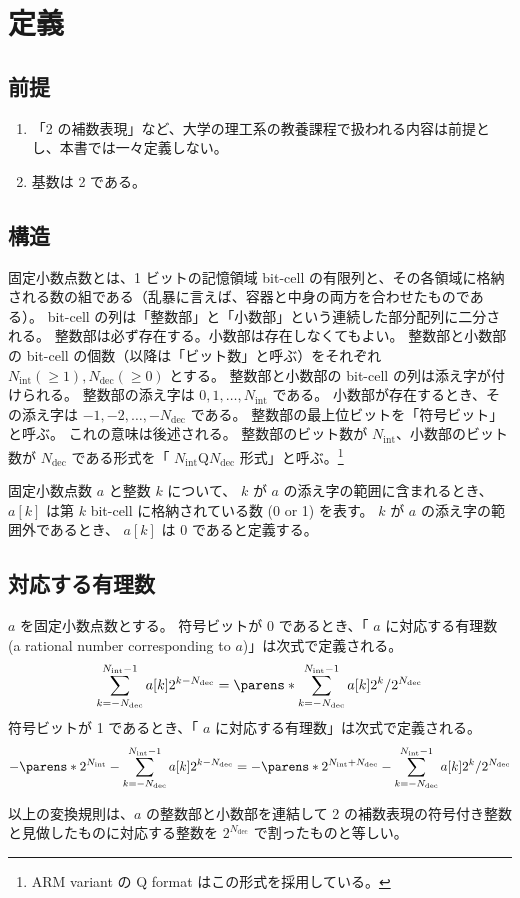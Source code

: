 \chapter{定義}
    \newcommand{\Ni}{{N_\text{int}}}
    \newcommand{\Nd}{{N_\text{dec}}}
    \section{前提}
        \label{fxd-pt_num::def::prem}
        \begin{enumerate}
            \item 「2 の補数表現」など、大学の理工系の教養課程で扱われる内容は前提とし、本書では一々定義しない。
            \item 基数は 2 である。
        \end{enumerate}
    \section{構造}
        固定小数点数とは、1 ビットの記憶領域 bit-cell の有限列と、その各領域に格納される数の組である（乱暴に言えば、容器と中身の両方を合わせたものである）。
        bit-cell の列は「整数部」と「小数部」という連続した部分配列に二分される。
        整数部は必ず存在する。小数部は存在しなくてもよい。
        整数部と小数部の bit-cell の個数（以降は「ビット数」と呼ぶ）をそれぞれ $\Ni(\geq 1), \Nd(\geq 0)$ とする。
        整数部と小数部の bit-cell の列は添え字が付けられる。
        整数部の添え字は $0,1,\dots,\Ni$ である。
        小数部が存在するとき、その添え字は $-1,-2,\dots,-\Nd$ である。
        整数部の最上位ビットを「符号ビット」と呼ぶ。
        これの意味は後述される。
        整数部のビット数が $\Ni$、小数部のビット数が $\Nd$ である形式を「 $\Ni$Q$\Nd$ 形式」と呼ぶ。\footnote{ARM variant の Q format はこの形式を採用している。}
        \par
        固定小数点数 $a$ と整数 $k$ について、 $k$ が $a$ の添え字の範囲に含まれるとき、$a[k]$ は第 $k$ bit-cell に格納されている数 (0 or 1) を表す。
        $k$ が $a$ の添え字の範囲外であるとき、 $a[k]$ は 0 であると定義する。
    \section{対応する有理数}
        $a$ を固定小数点数とする。
        符号ビットが 0 であるとき、「 $a$ に対応する有理数 (a rational number corresponding to $a$)」は次式で定義される。
        \[ \sum_{k=-\Nd}^{\Ni-1} a[k]2^{k-\Nd} = \parens*{\sum_{k=-\Nd}^{\Ni-1} a[k]2^k}/2^\Nd \]
        符号ビットが 1 であるとき、「 $a$ に対応する有理数」は次式で定義される。
        \[ -\parens*{2^\Ni - \sum_{k=-\Nd}^{\Ni-1} a[k]2^{k-\Nd}} = -\parens*{2^{\Ni+\Nd} - \sum_{k=-\Nd}^{\Ni-1} a[k]2^k}/2^\Nd \]
        \par
        以上の変換規則は、$a$ の整数部と小数部を連結して 2 の補数表現の符号付き整数と見做したものに対応する整数を $2^\Nd$ で割ったものと等しい。
